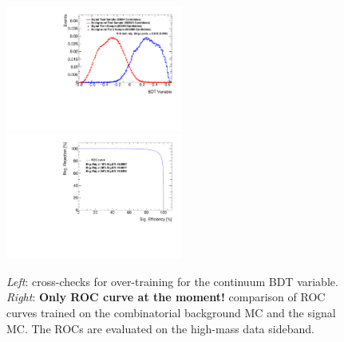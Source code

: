 \begin{figure}[!htb]
\begin{center}
\hspace{-0.5cm}
\includegraphics[width=0.52\textwidth]{figures/InternalNote_ContinuumBDT/KS.pdf}
\hspace{-0.5cm}
\includegraphics[width=0.52\textwidth]{figures/InternalNote_ContinuumBDT/ROC.pdf}
\caption{{\itshape Left}: cross-checks for over-training for the continuum BDT variable.
{\itshape{Right}}: \textbf{Only ROC curve at the moment!} comparison of ROC curves trained on the combinatorial background MC and the signal MC. The ROCs are evaluated on the high-mass data sideband.}
\label{fig:contBDT}
\end{center}
\end{figure}



\clearpage
